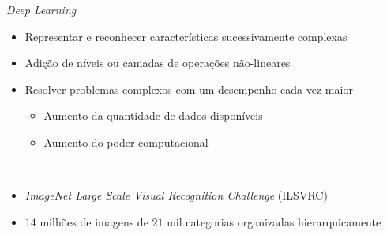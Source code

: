 %

\begin{frame}{\emph{Deep Learning}}
   \ \  \\[0.1cm]
   \begin{itemize}
     \item Representar e reconhecer características sucessivamente complexas
     \ \ \newline
     \item Adição de níveis ou camadas de operações não-lineares
     \ \ \newline
     \item Resolver problemas complexos com um desempenho cada vez maior
     \begin{itemize}
       \item Aumento da quantidade de dados disponíveis
       \item Aumento do poder computacional
     \end{itemize}
     \ \ \newline
     \item \emph{ImageNet Large Scale Visual Recognition Challenge} (ILSVRC)
     \item $14$ milhões de imagens de $21$ mil categorias organizadas hierarquicamente
   \end{itemize}
\end{frame}

